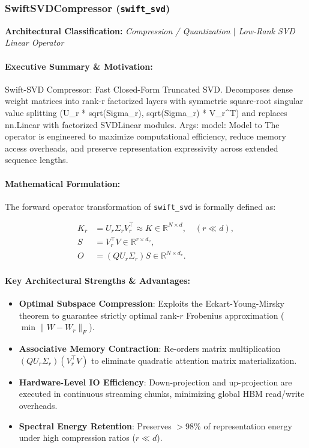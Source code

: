 \subsubsection{SwiftSVDCompressor (\texttt{swift\_svd})}
\label{sec:module_swift\_svd}

\textbf{Architectural Classification:} \textit{Compression / Quantization $\mid$ Low-Rank SVD Linear Operator}

\paragraph{Executive Summary \& Motivation:}
Swift-SVD Compressor: Fast Closed-Form Truncated SVD.  Decomposes dense weight matrices into rank-r factorized layers with symmetric square-root singular value splitting (U\_r * sqrt(Sigma\_r), sqrt(Sigma\_r) * V\_r^T) and replaces nn.Linear with factorized SVDLinear modules.  Args:     model: Model to The operator is engineered to maximize computational efficiency, reduce memory access overheads, and preserve representation expressivity across extended sequence lengths.

\paragraph{Mathematical Formulation:}
The forward operator transformation of \texttt{swift\_svd} is formally defined as:

\begin{align}
K_r &= U_r \Sigma_r V_r^\top \approx K \in \mathbb{R}^{N \times d}, \quad (r \ll d), \\
S &= V_r^\top V \in \mathbb{R}^{r \times d_v}, \\
O &= (Q U_r \Sigma_r) S \in \mathbb{R}^{N \times d_v}.
\end{align}


\paragraph{Key Architectural Strengths \& Advantages:}
\begin{itemize}
    \item \textbf{Optimal Subspace Compression}: Exploits the Eckart-Young-Mirsky theorem to guarantee strictly optimal rank-$r$ Frobenius approximation ($\min \|W - W_r\|_F$).
    \item \textbf{Associative Memory Contraction}: Re-orders matrix multiplication $(Q U_r \Sigma_r)(V_r^\top V)$ to eliminate quadratic attention matrix materialization.
    \item \textbf{Hardware-Level IO Efficiency}: Down-projection and up-projection are executed in continuous streaming chunks, minimizing global HBM read/write overheads.
    \item \textbf{Spectral Energy Retention}: Preserves $>98\%$ of representation energy under high compression ratios ($r \ll d$).
\end{itemize}

